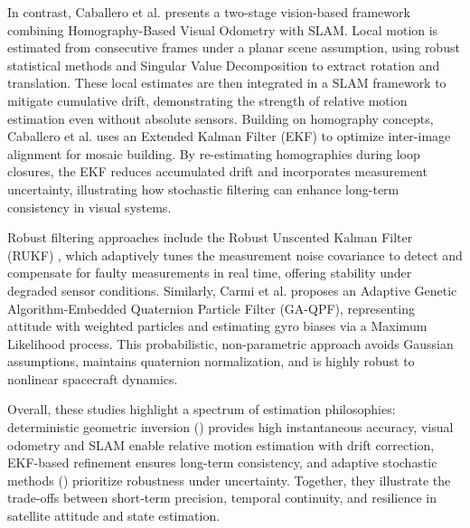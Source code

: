 \noindent
In contrast, Caballero et al. \cite{Caballero2009} presents a two-stage vision-based framework combining Homography-Based Visual Odometry with SLAM. Local motion is estimated from consecutive frames under a planar scene assumption, using robust statistical methods and Singular Value Decomposition to extract rotation and translation. These local estimates are then integrated in a SLAM framework to mitigate cumulative drift, demonstrating the strength of relative motion estimation even without absolute sensors. Building on homography concepts, Caballero et al. \cite{Caballero2009} uses an Extended Kalman Filter (EKF) to optimize inter-image alignment for mosaic building. By re-estimating homographies during loop closures, the EKF reduces accumulated drift and incorporates measurement uncertainty, illustrating how stochastic filtering can enhance long-term consistency in visual systems.
\vspace{0.5cm}

\noindent
Robust filtering approaches include the Robust Unscented Kalman Filter (RUKF) \cite{Soken2014}, which adaptively tunes the measurement noise covariance to detect and compensate for faulty measurements in real time, offering stability under degraded sensor conditions. Similarly, Carmi et al. \cite{Carmi2009} proposes an Adaptive Genetic Algorithm-Embedded Quaternion Particle Filter (GA-QPF), representing attitude with weighted particles and estimating gyro biases via a Maximum Likelihood process. This probabilistic, non-parametric approach avoids Gaussian assumptions, maintains quaternion normalization, and is highly robust to nonlinear spacecraft dynamics.
\vspace{0.5cm}

\noindent
Overall, these studies highlight a spectrum of estimation philosophies: deterministic geometric inversion (\cite{Bamber}) provides high instantaneous accuracy, visual odometry and SLAM \cite{Caballero2009} enable relative motion estimation with drift correction, EKF-based refinement \cite{Caballero2009} ensures long-term consistency, and adaptive stochastic methods (\cite{Soken2014, Carmi2009}) prioritize robustness under uncertainty. Together, they illustrate the trade-offs between short-term precision, temporal continuity, and resilience in satellite attitude and state estimation.


\label{sec:litconc}

